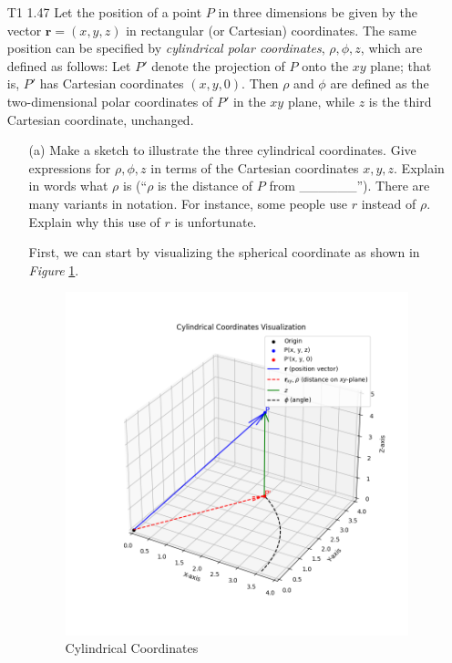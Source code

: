 \documentclass[12pt]{article}
\begin{document}
\begin{enumerate}
    \newpage
    \item[T1 1.47] Let the position of a point \( P \) in three dimensions be given by the vector \( \mathbf{r} = (x, y, z) \) in rectangular (or Cartesian) coordinates. The same position can be specified by \textit{cylindrical polar coordinates}, \( \rho, \phi, z \), which are defined as follows: Let \( P' \) denote the projection of \( P \) onto the \( xy \) plane; that is, \( P' \) has Cartesian coordinates \( (x, y, 0) \). Then \( \rho \) and \( \phi \) are defined as the two-dimensional polar coordinates of \( P' \) in the \( xy \) plane, while \( z \) is the third Cartesian coordinate, unchanged.

        \begin{itemize}
            \item[(a)] Make a sketch to illustrate the three cylindrical coordinates. Give expressions for \( \rho, \phi, z \) in terms of the Cartesian coordinates \( x, y, z \). Explain in words what \( \rho \) is (``\( \rho \) is the distance of \( P \) from \_\_\_\_\_\_''). There are many variants in notation. For instance, some people use \( r \) instead of \( \rho \). Explain why this use of \( r \) is unfortunate.

            First, we can start by visualizing the spherical coordinate as shown in \textit{Figure} \ref{fig:1.47}. 
            \begin{figure}[!h]
                \centering
                \includegraphics[width=0.5\linewidth]{Pictures/PS00/Figure_5.png}
                \caption{Cylindrical Coordinates}
                \label{fig:1.47}
            \end{figure}


\end{itemize}
\end{enumerate}
\end{document}

